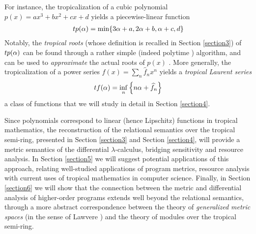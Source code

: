 For instance, the tropicalization of a cubic polynomial $p(x)=ax^{3}+bx^{2}+cx+d$ yields a piecewise-linear function 
\begin{align}
\trop p(\alpha)= \min\{ 3\alpha+a, 2\alpha+b, \alpha+c,d\}
\end{align}
Notably, the \emph{tropical roots} (whose definition is recalled in Section \ref{section3}) of $\trop p(\alpha)$ can be found through a rather simple (indeed polytime \cite{}) algorithm, and can be used to \emph{approximate} the actual roots of $p(x)$ \cite{}. 
More generally, the tropicalization of a power series $f(x)=\sum_{n}\widehat f_{n}x^{n}$ yields a \emph{tropical Laurent series} \cite{} 
\begin{align}
\trop f(\alpha)= \inf_{n}\left\{n\alpha+ \widehat f_{n}\right\}
\end{align}
a class of functions that we will study in detail in Section \ref{section4}.

Since polynomials correspond to linear (hence Lipschitz) functions in tropical mathematics, the reconstruction of the relational semantics over the tropical semi-ring, presented in Section \ref{section3} and Section \ref{section4}, will provide a metric semantics of the differential $\lambda$-calculus, bridging sensitivity and resource analysis. 
In Section \ref{section5} we will suggest potential applications of this approach, relating well-studied applications of program metrics, resource analysis with current uses of tropical mathematics in computer science.  
Finally, in Section \ref{section6} we will show that the connection between the metric and differential analysis of higher-order programs extends well beyond the relational semantics, through a more abstract correspondence between the theory of 
\emph{generalized metric spaces} (in the sense of Lawvere \cite{}) and the theory of modules over the tropical semi-ring.









